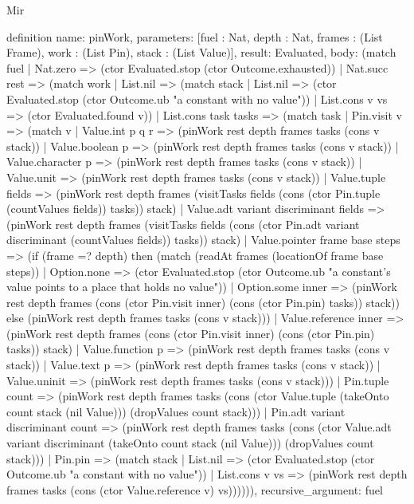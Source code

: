 \begin{lexlean}{Mir}
\begin{semanticmodule}
definition{
  name: pinWork,
  parameters: [fuel : Nat, depth : Nat, frames : (List Frame), work : (List Pin), stack : (List Value)],
  result: Evaluated,
  body: (match fuel
    | Nat.zero => (ctor Evaluated.stop (ctor Outcome.exhausted))
    | Nat.succ rest => (match work
      | List.nil => (match stack
        | List.nil => (ctor Evaluated.stop (ctor Outcome.ub "a constant with no value"))
        | List.cons v vs => (ctor Evaluated.found v))
      | List.cons task tasks => (match task
        | Pin.visit v => (match v
          | Value.int p q r => (pinWork rest depth frames tasks (cons v stack))
          | Value.boolean p => (pinWork rest depth frames tasks (cons v stack))
          | Value.character p => (pinWork rest depth frames tasks (cons v stack))
          | Value.unit => (pinWork rest depth frames tasks (cons v stack))
          | Value.tuple fields => (pinWork rest depth frames (visitTasks fields (cons (ctor Pin.tuple (countValues fields)) tasks)) stack)
          | Value.adt variant discriminant fields => (pinWork rest depth frames (visitTasks fields (cons (ctor Pin.adt variant discriminant (countValues fields)) tasks)) stack)
          | Value.pointer frame base steps => (if (frame =? depth) then (match (readAt frames (locationOf frame base steps))
              | Option.none => (ctor Evaluated.stop (ctor Outcome.ub "a constant's value points to a place that holds no value"))
              | Option.some inner => (pinWork rest depth frames (cons (ctor Pin.visit inner) (cons (ctor Pin.pin) tasks)) stack)) else (pinWork rest depth frames tasks (cons v stack)))
          | Value.reference inner => (pinWork rest depth frames (cons (ctor Pin.visit inner) (cons (ctor Pin.pin) tasks)) stack)
          | Value.function p => (pinWork rest depth frames tasks (cons v stack))
          | Value.text p => (pinWork rest depth frames tasks (cons v stack))
          | Value.uninit => (pinWork rest depth frames tasks (cons v stack)))
        | Pin.tuple count => (pinWork rest depth frames tasks (cons (ctor Value.tuple (takeOnto count stack (nil Value))) (dropValues count stack)))
        | Pin.adt variant discriminant count => (pinWork rest depth frames tasks (cons (ctor Value.adt variant discriminant (takeOnto count stack (nil Value))) (dropValues count stack)))
        | Pin.pin => (match stack
          | List.nil => (ctor Evaluated.stop (ctor Outcome.ub "a constant with no value"))
          | List.cons v vs => (pinWork rest depth frames tasks (cons (ctor Value.reference v) vs)))))),
  recursive_argument: fuel
}


\end{semanticmodule}
\end{lexlean}
